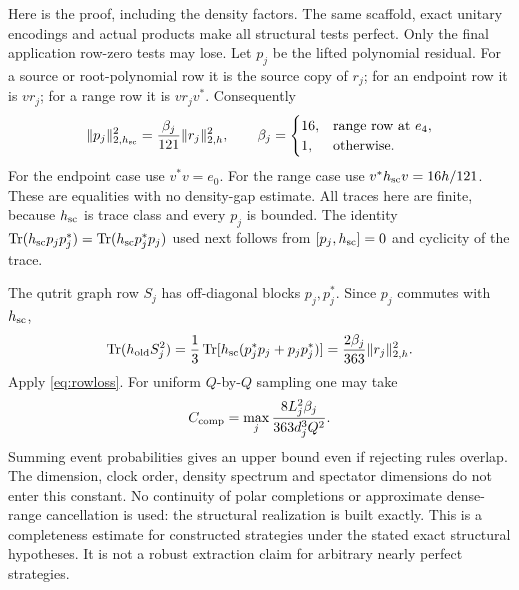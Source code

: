Here is the proof, including the density factors. The same scaffold, exact unitary encodings and actual products make all structural tests perfect. Only the final application row-zero tests may lose. Let $p_j$ be the lifted polynomial residual. For a source or root-polynomial row it is the source copy of $r_j$; for an endpoint row it is $vr_j$; for a range row it is $vr_jv^*$. Consequently
\[
 \|p_j\|_{2,h_{\rm sc}}^2=\frac{\beta_j}{121}\|r_j\|_{2,h}^2,
 \qquad \beta_j=\begin{cases}16,&\text{range row at }e_4,\\1,&\text{otherwise}.\end{cases}
\]
For the endpoint case use $v^*v=e_0$. For the range case use $v^*h_{\rm sc}v=16h/121$. These are equalities with no density-gap estimate.
All traces here are finite, because $h_{\rm sc}$ is trace class and every $p_j$ is bounded. The identity $\operatorname{Tr}(h_{\rm sc}p_jp_j^*)=\operatorname{Tr}(h_{\rm sc}p_j^*p_j)$ used next follows from $[p_j,h_{\rm sc}]=0$ and cyclicity of the trace.

The qutrit graph row $S_j$ has off-diagonal blocks $p_j,p_j^*$. Since $p_j$ commutes with $h_{\rm sc}$,
\[
 \operatorname{Tr}(h_{\rm old}S_j^2)
 =\frac13\operatorname{Tr}[h_{\rm sc}(p_j^*p_j+p_jp_j^*)]
 =\frac{2\beta_j}{363}\|r_j\|_{2,h}^2.
\]
Apply \eqref{eq:rowloss}. For uniform $Q$-by-$Q$ sampling one may take
\begin{equation}\label{eq:generalconstant}
 C_{\rm comp}=\max_j\frac{8L_j^2\beta_j}{363d_j^3Q^2}.
\end{equation}
Summing event probabilities gives an upper bound even if rejecting rules overlap. The dimension, clock order, density spectrum and spectator dimensions do not enter this constant. No continuity of polar completions or approximate dense-range cancellation is used: the structural realization is built exactly. This is a completeness estimate for constructed strategies under the stated exact structural hypotheses. It is not a robust extraction claim for arbitrary nearly perfect strategies.
